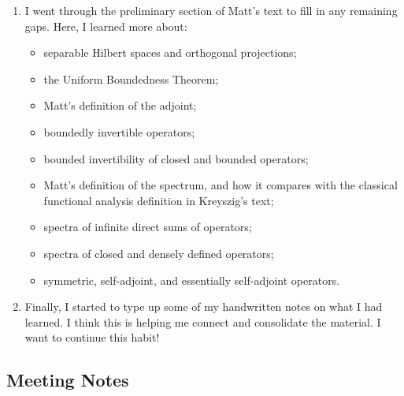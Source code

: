 \documentclass[12pt,a4paper]{article}
\begin{document}
\begin{enumerate}
    \item I went through the preliminary section of Matt's text to fill in any remaining gaps. Here, I learned more about:
    \begin{itemize}
        \item separable Hilbert spaces and orthogonal projections;
        \item the Uniform Boundedness Theorem;
        \item Matt's definition of the adjoint;
        \item boundedly invertible operators;
        \item bounded invertibility of closed and bounded operators;
        \item Matt's definition of the spectrum, and how it compares with the classical functional analysis definition in Kreyszig's text;
        \item spectra of infinite direct sums of operators;
        \item spectra of closed and densely defined operators;
        \item symmetric, self-adjoint, and essentially self-adjoint operators.
    \end{itemize}

    \item Finally, I started to type up some of my handwritten notes on what I had learned. I think this is helping me connect and consolidate the material. I want to continue this habit!
\end{enumerate}


\subsection{Meeting Notes}
\end{document}
